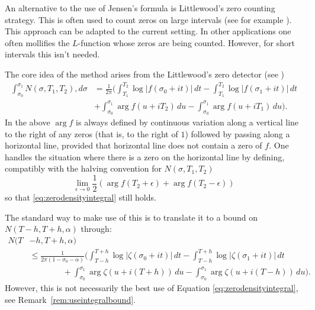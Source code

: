 \documentclass[10pt,english,letter, reqno]{amsart}
\theoremstyle{plain}
\theoremstyle{definition}
\begin{document}
An alternative to the use of Jensen's formula is Littlewood's zero counting strategy. 
This is often used to count zeros on large intervals (see for example \cite{KadiriLumleyNg2018,Farzanfard2024,Chourasiya2024,ChourasiyaSimonic2025,Simonic2019}).
This approach can be adapted to the current setting.
In other applications one often mollifies the $L$-function whose zeros are being counted. However, for short intervals this isn't needed.

The core idea of the method arises from the Littlewood's zero detector (see \cite[Section~9.9]{Titchmarsh1986})
\begin{equation}\label{eq:zerodensityintegral}
\begin{aligned}
\int_{\sigma_0}^{\sigma_1} N(\sigma,T_1,T_2),d\sigma &= \frac{1}{2\pi}\Biggl(
 \int_{T_1}^{T_2} \log|f(\sigma_0 +it)|\,dt
- \int_{T_1}^{T_2} \log|f(\sigma_1 +it)|\,dt\\
& + \int_{\sigma_0}^{\sigma_1} \arg f( u+iT_2)\,du
 - \int_{\sigma_0}^{\sigma_1} \arg f( u+iT_1)\,du \Biggr).
 \end{aligned}
 \end{equation}
In the above $\arg f$ is always defined by continuous variation along a vertical line to the right of any zeros (that is, to the right of $1$) followed by passing along a horizontal line, provided that horizontal line does not contain a zero of $f$. One handles the situation where there is a zero on the horizontal line by defining, compatibly with the halving convention for $N(\sigma,T_1,T_2)$ 
\[ \lim_{\epsilon\to0} \frac{1}{2}\left(\arg f(T_2 + \epsilon)+\arg f( T_2 - \epsilon)\right) \] 
so that \eqref{eq:zerodensityintegral} still holds.
 
The standard way to make use of this is to translate it to a bound on $N(T-h,T+h,\alpha)$ through:
\begin{equation}\label{eq:simplelittlewoodzerodensity}
    \begin{aligned} N(T&-h, T+h,\alpha)  \\&
    \leq\frac{1}{2\pi(1-\sigma_0-\alpha)} \Biggl(  \int_{T-h}^{T+h} \log|\zeta(\sigma_0 +it)|\,dt
- \int_{T-h}^{T+h} \log|\zeta(\sigma_1 +it)|\,dt\\
& \qquad\qquad+ \int_{\sigma_0}^{\sigma_1} \arg \zeta( u+i(T+h))\,du
 - \int_{\sigma_0}^{\sigma_1} \arg \zeta( u+i(T-h))\,du \Biggr).
    \end{aligned}
\end{equation}
However, this is not necessarily the best use of Equation \eqref{eq:zerodensityintegral}, see Remark~\ref{rem:useintegralbound}.
\end{document}

